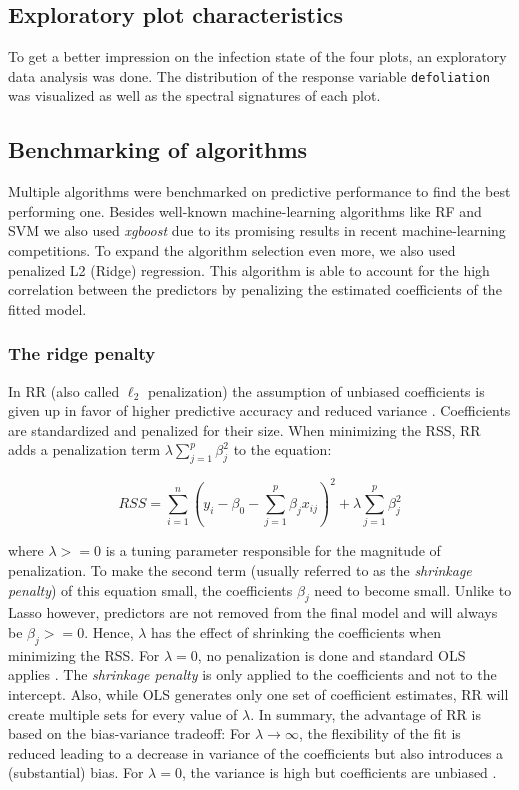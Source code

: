 \documentclass[review]{elsarticle}
\begin{document}
\subsection{Exploratory plot characteristics}

To get a better impression on the infection state of the four plots, an exploratory data analysis was done.
The distribution of the response variable \texttt{defoliation} was visualized as well as the spectral signatures of each plot.

\subsection{Benchmarking of algorithms}

Multiple algorithms were benchmarked on predictive performance to find the best performing one.
Besides well-known machine-learning algorithms like \ac{RF} and \ac{SVM} we also used \textit{xgboost} due to its promising results in recent machine-learning competitions.
To expand the algorithm selection even more, we also used penalized L2 (Ridge) regression.
This algorithm is able to account for the high correlation between the predictors by penalizing the estimated coefficients of the fitted model.

\subsubsection{The ridge penalty}

In \ac{RR} (also called $\ell_{2}$ penalization) the assumption of unbiased coefficients is given up in favor of higher predictive accuracy and reduced variance \citep{Hastie2001}.
Coefficients are standardized and penalized for their size.
When minimizing the \ac{RSS}, \ac{RR} adds a penalization term $\lambda \sum_{j=1}^{p}\beta_{j}^{2}$ to the equation:

\begin{equation}
	RSS = \sum_{i=1}^{n} \left(y_{i} - \beta_{0} - \sum_{j=1}^{p} \beta_{j} x_{ij} \right) ^{2} + \lambda \sum_{j=1}^{p}\beta_{j}^{2}
\end{equation}

where $\lambda >= 0$ is a tuning parameter responsible for the magnitude of penalization.
To make the second term (usually referred to as the \textit{shrinkage penalty}) of this equation small, the coefficients $\beta_{j}$ need to become small.
Unlike to Lasso however, predictors are not removed from the final model and will always be $\beta_{j} >= 0$.
Hence, $\lambda$ has the effect of shrinking the coefficients when minimizing the \ac{RSS}.
For $\lambda = 0$, no penalization is done and standard \ac{OLS} applies \citep{James2013}.
The \textit{shrinkage penalty} is only applied to the coefficients and not to the intercept.
Also, while \ac{OLS} generates only one set of coefficient estimates, \ac{RR} will create multiple sets for every value of $\lambda$.
In summary, the advantage of \ac{RR} is based on the bias-variance tradeoff: For $\lambda\to\infty$, the flexibility of the fit is reduced leading to a decrease in variance of the coefficients but also introduces a (substantial) bias.
For $\lambda = 0$, the variance is high but coefficients are unbiased \citep{James2013}.
\end{document}
